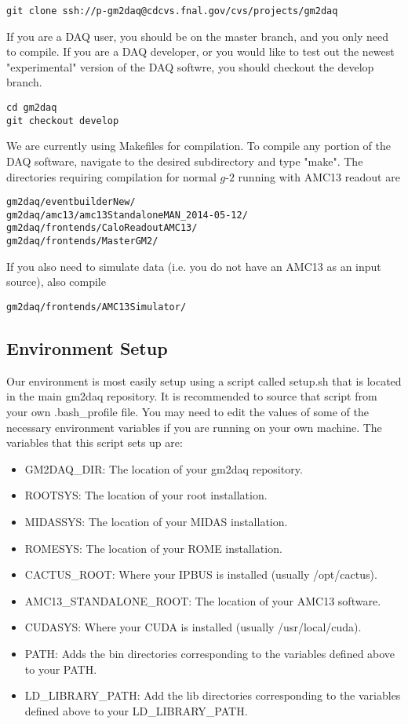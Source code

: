 \begin{verbatim}
git clone ssh://p-gm2daq@cdcvs.fnal.gov/cvs/projects/gm2daq
\end{verbatim}

If you are a DAQ user, you should be on the master branch, and you only need to compile. If you are a DAQ developer, or you would like to test out the newest "experimental" version of the DAQ softwre, you should checkout the develop branch.

\begin{verbatim}
cd gm2daq
git checkout develop
\end{verbatim}

We are currently using Makefiles for compilation. To compile any portion of the DAQ software, navigate to the desired subdirectory and type "make". The directories requiring compilation for normal $g$-$2$ running with AMC13 readout are

\begin{verbatim}
gm2daq/eventbuilderNew/
gm2daq/amc13/amc13StandaloneMAN_2014-05-12/
gm2daq/frontends/CaloReadoutAMC13/
gm2daq/frontends/MasterGM2/
\end{verbatim}

If you also need to simulate data (i.e. you do not have an AMC13 as an input source), also compile

\begin{verbatim}
gm2daq/frontends/AMC13Simulator/
\end{verbatim}

\subsection{Environment Setup}

Our environment is most easily setup using a script called setup.sh that is located in the main gm2daq repository. It is recommended to source that script from your own .bash\_profile file. You may need to edit the values of some of the necessary environment variables if you are running on your own machine. The variables that this script sets up are:

\begin{itemize}
\item GM2DAQ\_DIR: The location of your gm2daq repository.
\item ROOTSYS: The location of your root installation.
\item MIDASSYS: The location of your MIDAS installation.
\item ROMESYS: The location of your ROME installation.
\item CACTUS\_ROOT: Where your IPBUS is installed (usually /opt/cactus).
\item AMC13\_STANDALONE\_ROOT: The location of your AMC13 software.
\item CUDASYS: Where your CUDA is installed (usually /usr/local/cuda).
\item PATH: Adds the bin directories corresponding to the variables defined above to your PATH.
\item LD\_LIBRARY\_PATH: Add the lib directories corresponding to the variables defined above to your LD\_LIBRARY\_PATH.
\end{itemize}

